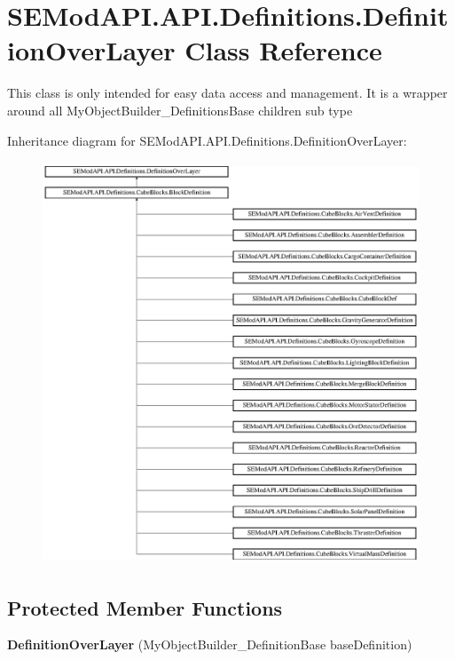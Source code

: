 \hypertarget{class_s_e_mod_a_p_i_1_1_a_p_i_1_1_definitions_1_1_definition_over_layer}{}\section{S\+E\+Mod\+A\+P\+I.\+A\+P\+I.\+Definitions.\+Definition\+Over\+Layer Class Reference}
\label{class_s_e_mod_a_p_i_1_1_a_p_i_1_1_definitions_1_1_definition_over_layer}


This class is only intended for easy data access and management. It is a wrapper around all My\+Object\+Builder\+\_\+\+Definitions\+Base children sub type  


Inheritance diagram for S\+E\+Mod\+A\+P\+I.\+A\+P\+I.\+Definitions.\+Definition\+Over\+Layer\+:\begin{figure}[H]
\begin{center}
\leavevmode
\includegraphics[height=12.000000cm]{class_s_e_mod_a_p_i_1_1_a_p_i_1_1_definitions_1_1_definition_over_layer}
\end{center}
\end{figure}
\subsection*{Protected Member Functions}
\begin{DoxyCompactItemize}
\item 
\hypertarget{class_s_e_mod_a_p_i_1_1_a_p_i_1_1_definitions_1_1_definition_over_layer_aa2ebf3d44617fb2edbf12e94af132149}{}{\bfseries Definition\+Over\+Layer} (My\+Object\+Builder\+\_\+\+Definition\+Base base\+Definition)\label{class_s_e_mod_a_p_i_1_1_a_p_i_1_1_definitions_1_1_definition_over_layer_aa2ebf3d44617fb2edbf12e94af132149}

\end{DoxyCompactItemize}
